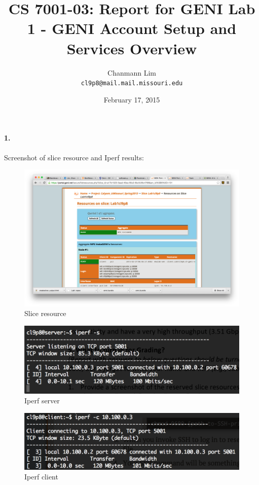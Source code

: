 \documentclass[a4paper]{article}
\begin{document}
\title{CS 7001-03: Report for GENI Lab 1 - GENI Account Setup and Services Overview}
\author{Chanmann Lim\\ 
	\texttt{cl9p8@mail.mail.missouri.edu}}
\date{February 17, 2015}
\maketitle

\paragraph{1. } Screenshot of slice resource and Iperf results: \\
\begin{figure}[h!]
  \centering
    \includegraphics[scale=.32]{slice_resource.png}
  \caption{Slice resource}
\end{figure}

\begin{figure}[h!]
  \centering
    \includegraphics[scale=.5]{iperf_server.png}
  \caption{Iperf server}
\end{figure}

\begin{figure}[h!]
  \centering
    \includegraphics[scale=.5]{iperf_client.png}
  \caption{Iperf client}
\end{figure}
\vfill
\end{document}
